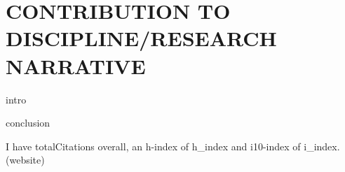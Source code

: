 \section{CONTRIBUTION TO DISCIPLINE/RESEARCH NARRATIVE}
{{intro}}

{{conclusion}}


I have {{totalCitations}} overall, an h-index of {{h_index}} and i10-index of {{i_index}}.
({{website}})